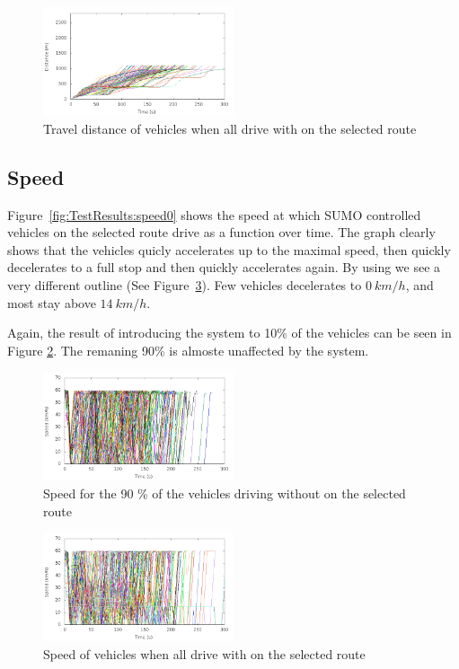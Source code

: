 \begin{figure}[H]
\includegraphics[width=0.5\textwidth]{../images/tp0/distanceControlled100.png}
\caption{Travel distance of vehicles when all drive with \tech on the selected route}
\label{fig:TestResults:distance100}
\end{figure}

\subsection{Speed}
Figure~\ref{fig:TestResults:speed0} shows the speed at which SUMO controlled vehicles on the selected route drive as a function over time.
The graph clearly shows that the vehicles quicly accelerates up to the maximal speed, then quickly decelerates to a full stop and then quickly accelerates again.
By using \tech we see a very different outline (See Figure~\ref{fig:TestResults:speed100}).
Few vehicles decelerates to $0\ km/h$, and most stay above $14\ km/h$.

Again, the result of introducing the system to 10\% of the vehicles can be seen in Figure \ref{fig:TestResults:speedUnC10}. 
The remaning 90\% is almoste unaffected by the system.

\begin{figure}[H]
\includegraphics[width=0.5\textwidth]{../images/tp0/speedUncontrolled10.png}
\caption{Speed for the 90 \% of the vehicles driving without \tech on the selected route}
\label{fig:TestResults:speedUnC10}
\end{figure}

\begin{figure}[H]
\includegraphics[width=0.5\textwidth]{../images/tp0/speedControlled100.png}
\caption{Speed of vehicles when all drive with \tech on the selected route}
\label{fig:TestResults:speed100}
\end{figure}
